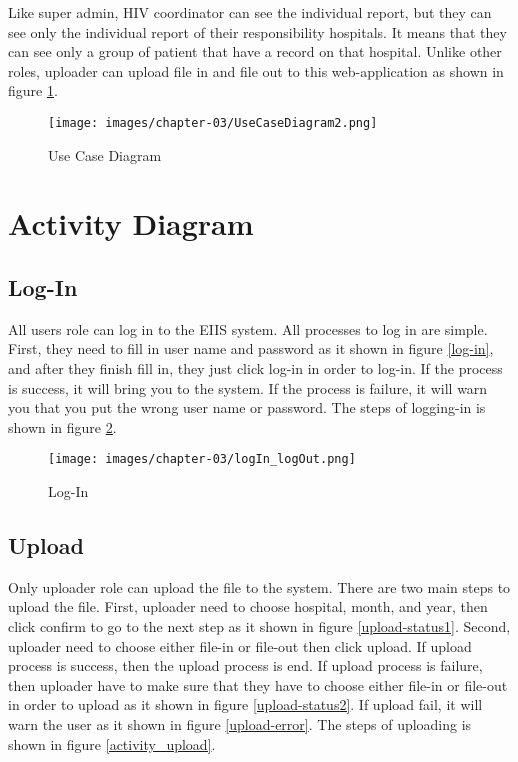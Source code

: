 	Like super admin, HIV coordinator can see the individual report, but they can see only the individual report of their responsibility hospitals. It means that they can see only a group of patient that have a record on that hospital. Unlike other roles, uploader can upload file in and file out to this web-application as shown in figure \ref{use-case2}.
	
	\vspace{15mm}
	\FloatBarrier
    	\begin{figure}[h!]
            \centering
        		\texttt{[image: images/chapter-03/UseCaseDiagram2.png]}
        		\caption{Use Case Diagram}
        		\label{use-case2}
        \end{figure}
	\FloatBarrier
	
\clearpage
\section{Activity Diagram}

    \subsection{Log-In}
    All users role can log in to the EIIS system. All processes to log in are simple. First, they need to fill in user name and password as it shown in figure \ref{log-in}, and after they finish fill in, they just click log-in in order to log-in. If the process is success, it will bring you to the system. If the process is failure, it will warn you that you put the wrong user name or password. The steps of logging-in is shown in figure \ref{log-in-activity-diagram}. 

    \vspace{10mm}
    \FloatBarrier
    	\begin{figure}[h!]
            \centering
        		\texttt{[image: images/chapter-03/logIn\_logOut.png]}
        		\caption{Log-In}
        		\label{log-in-activity-diagram}
        \end{figure}
	\FloatBarrier
	
	
	\subsection{Upload} \label{upload_file_activity_diagram}
	Only uploader role can upload the file to the system. There are two main steps to upload the file. First, uploader need to choose hospital, month, and year, then click confirm to go to the next step as it shown in figure \ref{upload-status1}. Second, uploader need to choose either file-in or file-out then click upload. If upload process is success, then the upload process is end. If upload process is failure, then uploader have to make sure that they have to choose either file-in or file-out in order to upload as it shown in figure \ref{upload-status2}. If upload fail, it will warn the user as it shown in figure \ref{upload-error}. The steps of uploading is shown in figure \ref{activity_upload}.
	
